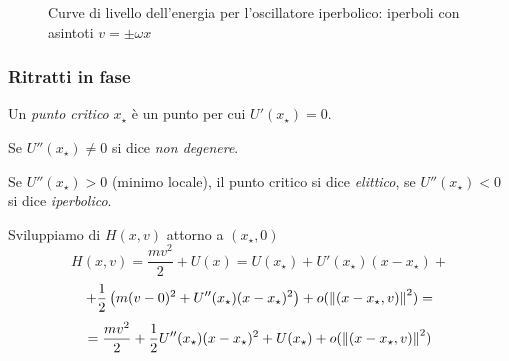 \begin{example}
\begin{figure}[ht]
        \caption{Curve di livello dell'energia per l'oscillatore iperbolico: iperboli con asintoti $v=\pm\omega x$}
    \end{figure}

\end{example}


\subsubsection{Ritratti in fase}

\begin{definition}
    Un \textit{punto critico} $x_\star$ è un punto per cui $U'(x_\star)=0$.
\end{definition}
\begin{definition}
    Se $U''(x_\star)\neq 0 $ si dice \textit{non degenere}.
\end{definition}
\begin{definition}
    Se $U''(x_\star)>0$ (minimo locale), il punto critico si dice \textit{elittico}, se $U''(x_\star)<0$ si dice \textit{iperbolico}.   
\end{definition}

Sviluppiamo di $H(x,v)$ attorno a $(x_\star,0)$
\begin{equation*}
    H(x,v) = \frac{mv^2}{2} + U(x) = U(x_\star) + U'(x_\star)(x - x_\star) + 
\end{equation*}
\begin{equation*}
    + \frac{1}{2} \left( m(v-0)^2 +U''(x_\star)(x - x_\star)^2 \right) + o(\norm{(x - x_\star, v)}^2)=
\end{equation*}
\begin{equation}
    = \frac{mv^2}{2} + \frac{1}{2} U''(x_\star)(x - x_\star)^2 + U(x_\star) + o(\norm{(x - x_\star, v)}^2)
\end{equation}

